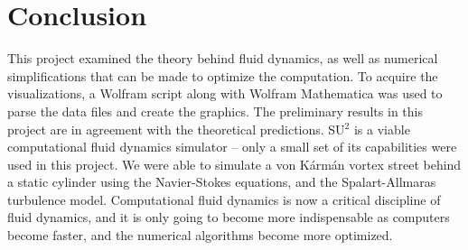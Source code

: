 \documentclass[10pt, titlepage]{article}
\begin{document}
\newpage

\section{Conclusion}

This project examined the theory behind fluid dynamics, as well as numerical simplifications that can be made to optimize the computation. To acquire the visualizations, a Wolfram script along with Wolfram Mathematica was used to parse the data files and create the graphics. The preliminary results in this project are in agreement with the theoretical predictions. SU$^2$ is a viable computational fluid dynamics simulator -- only a small set of its capabilities were used in this project. We were able to simulate a von K\'{a}rm\'{a}n vortex street behind a static cylinder using the Navier-Stokes equations, and the Spalart-Allmaras turbulence model. Computational fluid dynamics is now a critical discipline of fluid dynamics, and it is only going to become more indispensable as computers become faster, and the numerical algorithms become more optimized.

\newpage
\end{document}
